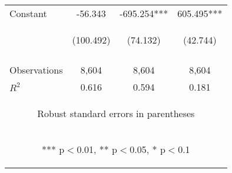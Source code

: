 \begin{center}
\begin{tabular}{lccc}
Constant & -56.343 & -695.254*** & 605.495*** \\
 & \begin{footnotesize}(100.492)\end{footnotesize} & \begin{footnotesize}(74.132)\end{footnotesize} & \begin{footnotesize}(42.744)\end{footnotesize} \\
\vspace{4pt} & \begin{footnotesize}\end{footnotesize} & \begin{footnotesize}\end{footnotesize} & \begin{footnotesize}\end{footnotesize} \\
Observations & 8,604 & 8,604 & 8,604 \\
 $R^2$ & 0.616 & 0.594 & 0.181 \\ \hline
\multicolumn{4}{c}{\begin{footnotesize} Robust standard errors in parentheses\end{footnotesize}} \\
\multicolumn{4}{c}{\begin{footnotesize} *** p$<$0.01, ** p$<$0.05, * p$<$0.1\end{footnotesize}} \\
\end{tabular}
\end{center}
